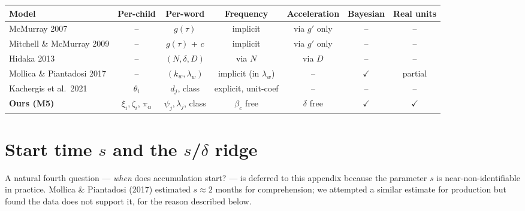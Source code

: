 \documentclass[11pt]{article}
\begin{document}
\begin{center}
\small
\begin{tabular}{@{}lcccccc@{}}
\toprule
Model & Per-child & Per-word & Frequency & Acceleration & Bayesian & Real units \\
\midrule
McMurray 2007            & --      & \(g(\tau)\)         & implicit          & via \(g'\) only & --     & --     \\
Mitchell \& McMurray 2009 & --      & \(g(\tau)\) + \(c\)  & implicit          & via \(g'\) only & --     & --     \\
Hidaka 2013              & --      & \((N, \delta, D)\)  & via \(N\)         & via \(D\)       & --     & --     \\
Mollica \& Piantadosi 2017 & --      & \((k_w, \lambda_w)\) & implicit (in \(\lambda_w\)) & --     & \(\checkmark\) & partial \\
Kachergis et al.\ 2021   & \(\theta_i\) & \(d_j\), class    & explicit, unit-coef & --      & --     & --     \\
\textbf{Ours (M5)}       & \(\xi_i, \zeta_i\), \(\pi_\alpha\) & \(\psi_j, \lambda_j\), class & \(\beta_c\) free & \(\delta\) free & \(\checkmark\) & \(\checkmark\) \\
\bottomrule
\end{tabular}
\end{center}

\appendix

\section{Start time \(s\) and the \(s\)/\(\delta\) ridge}
\label{sec:s-non-id}

A natural fourth question — \emph{when} does accumulation start? — is
deferred to this appendix because the parameter \(s\) is
near-non-identifiable in practice. Mollica \& Piantadosi (2017)
estimated \(s \approx 2\) months for comprehension; we attempted a
similar estimate for production but found the data does not support
it, for the reason described below.
\end{document}
